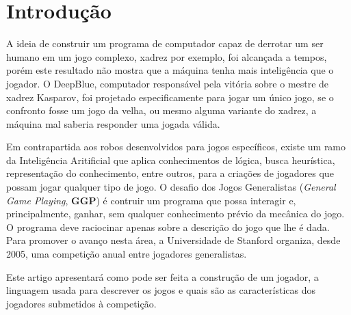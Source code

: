 \section{Introdução}
A ideia de construir um programa de computador capaz de derrotar um ser humano 
em um jogo complexo, xadrez por exemplo, foi alcançada a tempos, porém este 
resultado não mostra que a máquina tenha mais inteligência que o jogador. O 
DeepBlue, computador responsável pela vitória sobre o mestre de xadrez Kasparov, 
foi projetado especificamente para jogar um único jogo, se o confronto fosse um 
jogo da velha, ou mesmo alguma variante do xadrez, a máquina mal saberia 
responder uma jogada válida. 

Em contrapartida aos robos desenvolvidos para jogos específicos, existe um ramo
da Inteligência Aritificial que aplica conhecimentos de lógica, busca 
heurística, representação do conhecimento, entre outros, para a criações de
jogadores que possam jogar qualquer tipo de jogo. 
O desafio dos Jogos Generalistas ({\it General Game Playing}, {\bf GGP}) é
contruir um programa que possa interagir e, principalmente, ganhar, sem qualquer
conhecimento prévio da mecânica do jogo. O programa deve raciocinar apenas sobre
a descrição do jogo que lhe é dada. Para promover o avanço nesta área, a
Universidade de Stanford organiza, desde 2005, uma competição anual entre
jogadores generalistas. 

Este artigo apresentará como pode ser feita a construção de um jogador, a
linguagem usada para descrever os jogos e quais são as características dos
jogadores submetidos à competição. 
